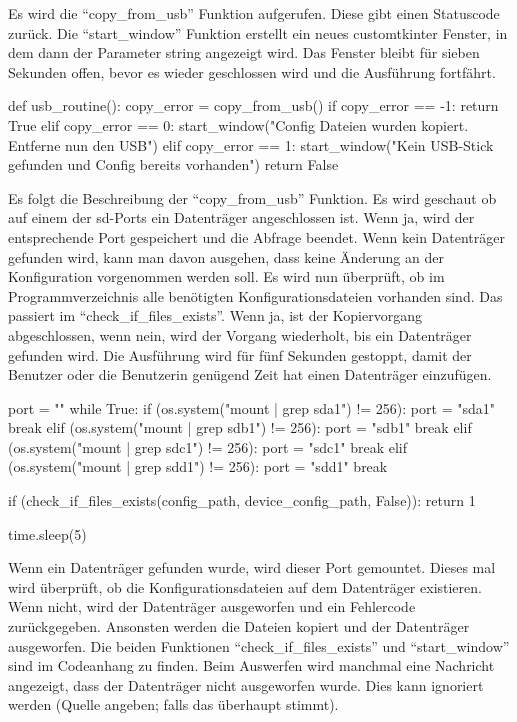 Es wird die \enquote{copy\_from\_usb} Funktion aufgerufen. Diese gibt einen Statuscode zurück. Die \enquote{start\_window} Funktion erstellt ein neues customtkinter Fenster, in dem dann der Parameter string angezeigt wird. Das Fenster bleibt für sieben Sekunden offen, bevor es wieder geschlossen wird und die Ausführung fortfährt.

\begin{pythoncode}
def usb_routine():
	copy_error = copy_from_usb()
	if copy_error == -1:
		return True
	elif copy_error == 0:
		start_window("Config Dateien wurden kopiert. Entferne nun den USB")   
	elif copy_error == 1: 
		start_window("Kein USB-Stick gefunden und Config bereits vorhanden")  
	return False
\end{pythoncode}

Es folgt die Beschreibung der \enquote{copy\_from\_usb} Funktion. Es wird geschaut ob auf einem der sd-Ports ein Datenträger angeschlossen ist. Wenn ja, wird der entsprechende Port gespeichert und die Abfrage beendet. Wenn kein Datenträger gefunden wird, kann man davon ausgehen, dass keine Änderung an der Konfiguration vorgenommen werden soll. Es wird nun überprüft, ob im Programmverzeichnis alle benötigten Konfigurationsdateien vorhanden sind. Das passiert im \enquote{check\_if\_files\_exists}. Wenn ja, ist der Kopiervorgang abgeschlossen, wenn nein, wird der Vorgang wiederholt, bis ein Datenträger gefunden wird. Die Ausführung wird für fünf Sekunden gestoppt, damit der Benutzer oder die Benutzerin genügend Zeit hat einen Datenträger einzufügen.

\begin{pythoncode}
	port = ""
	while True:
		if (os.system("mount | grep sda1") != 256):
			port = "sda1"
			break
		elif (os.system("mount | grep sdb1") != 256):
			port = "sdb1"
			break
		elif (os.system("mount | grep sdc1") != 256):
			port = "sdc1"
			break
		elif (os.system("mount | grep sdd1") != 256):
			port = "sdd1"
			break
		
		if (check_if_files_exists(config_path, device_config_path, False)):
			return 1
			
		time.sleep(5)
\end{pythoncode}

Wenn ein Datenträger gefunden wurde, wird dieser Port gemountet. Dieses mal wird überprüft, ob die Konfigurationsdateien auf dem Datenträger existieren. Wenn nicht, wird der Datenträger ausgeworfen und ein Fehlercode zurückgegeben. Ansonsten werden die Dateien kopiert und der Datenträger ausgeworfen. Die beiden Funktionen \enquote{check\_if\_files\_exists} und \enquote{start\_window} sind im Codeanhang zu finden. Beim Auswerfen wird manchmal eine Nachricht angezeigt, dass der Datenträger nicht ausgeworfen wurde. Dies kann ignoriert werden (Quelle angeben; falls das überhaupt stimmt).

